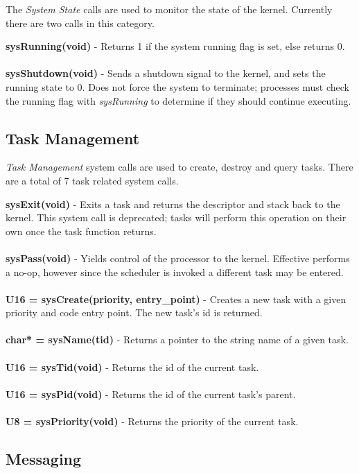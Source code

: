 \documentclass[twoside,a4paper]{refart}
\begin{document}
The \textit{System State} calls are used to monitor the state of the kernel. Currently there are two calls in this category.

\textbf{sysRunning(void)} - Returns 1 if the system running flag is set, else returns 0.\\\\
\textbf{sysShutdown(void)} - Sends a shutdown signal to the kernel, and sets the running state to 0. Does not force the system to terminate; processes must check the running flag with \textit{sysRunning} to determine if they should continue executing.

\subsection{Task Management}

\textit{Task Management} system calls are used to create, destroy and query tasks. There are a total of 7 task related system calls.

\textbf{sysExit(void)} - Exits a task and returns the descriptor and stack back to the kernel. This system call is deprecated; tasks will perform this operation on their own once the task function returns.\\\\
\textbf{sysPass(void)} - Yields control of the processor to the kernel. Effective performs a no-op, however since the scheduler is invoked a different task may be entered.\\\\
\textbf{U16 = sysCreate(priority, entry\_point)} - Creates a new task with a given priority and code entry point. The new task's id is returned.\\\\
\textbf{char* = sysName(tid)} - Returns a pointer to the string name of a given task.\\\\
\textbf{U16 = sysTid(void)} - Returns the id of the current task.\\\\
\textbf{U16 = sysPid(void)} - Returns the id of the current task's parent.\\\\
\textbf{U8 = sysPriority(void)} - Returns the priority of the current task.

\subsection{Messaging}
\end{document}
